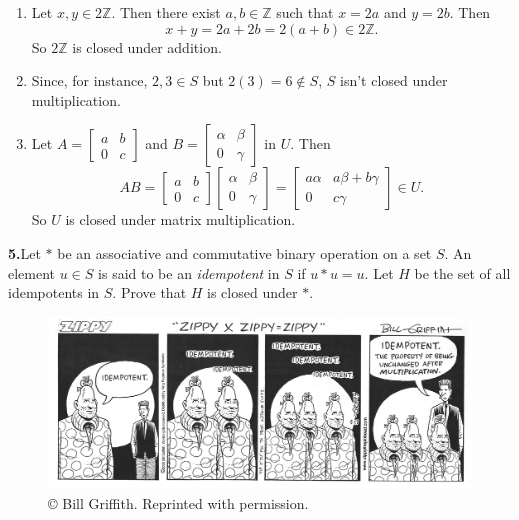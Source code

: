 \documentclass[10pt,]{book}
\theoremstyle{plain}
\theoremstyle{definition}
\theoremstyle{definition}
\theoremstyle{definition}
\theoremstyle{definition}
\numberwithin{equation}{section}
\def\Z{\mathbb{Z}}
\newcommand{\amp}{&}
\begin{document}
\leavevmode%
\begin{enumerate}[label=(\alph*)]
\item\hypertarget{li-71}{}Let \(x, y\in 2\Z\). Then there exist \(a,b\in \Z\) such that \(x=2a\) and \(y=2b\).  Then%
\begin{equation*}
x+y=2a+2b=2(a+b)\in 2\Z.
\end{equation*}
So \(2\Z\) is closed under addition.%
\item\hypertarget{li-72}{}Since, for instance, \(2,3\in S\) but \(2(3)=6\not\in S\), \(S\) isn't closed under multiplication.%
\item\hypertarget{li-73}{}Let \(A=\begin{bmatrix}a \amp b \\ 0 \amp c\end{bmatrix}\) and \(B=\begin{bmatrix}\alpha \amp \beta \\ 0 \amp \gamma\end{bmatrix}\) in \(U\). Then%
\begin{equation*}
AB=
\begin{bmatrix}
a \amp  b \\
0 \amp  c
\end{bmatrix} 
\begin{bmatrix}
\alpha \amp  \beta \\
0 \amp  \gamma
\end{bmatrix} 
=
\begin{bmatrix}
a\alpha \amp  a\beta+b\gamma \\
0 \amp  c\gamma
\end{bmatrix} 
\in U.
\end{equation*}
So \(U\) is closed under matrix multiplication.%
\end{enumerate}
\par\smallskip
\noindent\textbf{5.}\quad{}Let \(*\) be an associative and commutative binary operation on a set \(S\). An element \(u\in S\) is said to be an \emph{idempotent} in \(S\) if \(u*u=u\). Let \(H\) be the set of all idempotents in \(S\). Prove that \(H\) is closed under \(*\).%
\begin{figure}
\centering
\includegraphics[width=1\linewidth]{zippy.png}
\caption{©  Bill Griffith. Reprinted with permission.\label{zip}}
\end{figure}
\end{document}
